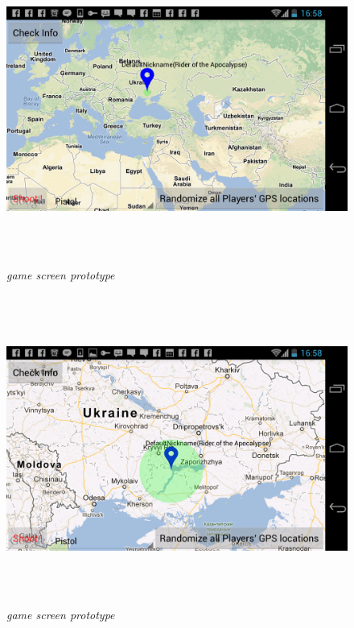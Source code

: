 \documentclass{article}
\begin{document}
\begin{figure}
\includegraphics[height=4in,width=7.12in]{./images/android_screenshots/ui_prototype/UI_prototype_1.png}  
\caption{\small \sl game screen prototype \label{fig:UIPrototype1}}
\end{figure}

\begin{figure}
\includegraphics[height=4in,width=7.12in]{./images/android_screenshots/ui_prototype/UI_prototype_2.png}  
\caption{\small \sl game screen prototype \label{fig:UIPrototype2}}
\end{figure}
\end{document}
